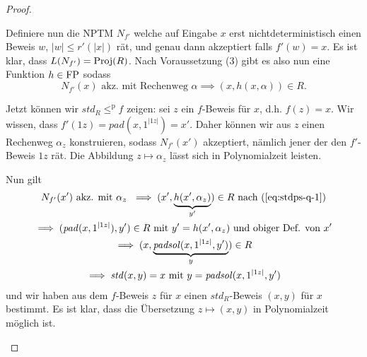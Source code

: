 \begin{proof}
\begin{prooflist}[label={}]
    Definiere nun die NPTM $N_{f'}$ welche auf Eingabe $x$ erst nichtdeterministisch einen Beweis $w$, $|w|\leq r'(|x|)$ rät, und genau dann akzeptiert falls $f'(w)=x$.
    Es ist klar, dass $L(N_{f'}) = \operatorname{Proj}(R)$.
    Nach Voraussetzung (3) gibt es also nun eine Funktion $h\in\mathrm{FP}$ sodass 
    \begin{equation} N_{f'}(x) \text{ akz. mit Rechenweg $\alpha$} \implies (x,h(x,\alpha))\in R.  \label{eq:stdps-q-1}
    \end{equation}

    Jetzt können wir $\mathit{std}_R \leq^\mathrm p f$ zeigen: sei $z$ ein $f$-Beweis für $x$, d.h. $f(z)=x$.
    Wir wissen, dass $f'(1z)=\mathit{pad}(x, 1^{|1z|})=x'$.
    Daher können wir aus $z$ einen Rechenweg $\alpha_z$ konstruieren, sodass $N_{f'}(x')$ akzeptiert, nämlich jener der den $f'$-Beweis $1z$ rät.
    Die Abbildung $z\mapsto \alpha_z$ lässt sich in Polynomialzeit leisten.

    Nun gilt
    \begin{gather*}
        N_{f'}(x') \text{ akz. mit $\alpha_z$ } \implies (x', \underbrace{h(x', \alpha_z)}_{y'})\in R \text{ nach (\ref{eq:stdps-q-1})}\\
        \implies (\mathit{pad}(x, 1^{|1z|}), y')\in R \text{ mit $y'=h(x', \alpha_z)$ und obiger Def. von $x'$} \\
        \implies (x, \underbrace{\mathit{padsol}(x, 1^{|1z|}, y')}_y) \in R\\
        \implies \mathit{std}(x, y)=x \text{ mit $y=\mathit{padsol}(x, 1^{|1z|}, y')$}
    \end{gather*}
    und wir haben aus dem $f$-Beweis $z$ für $x$ einen $\mathit{std}_R$-Beweis $(x,y)$ für $x$ bestimmt.
    Es ist klar, dass die Übersetzung $z\mapsto (x,y)$ in Polynomialzeit möglich ist.
\end{prooflist}
\end{proof}

